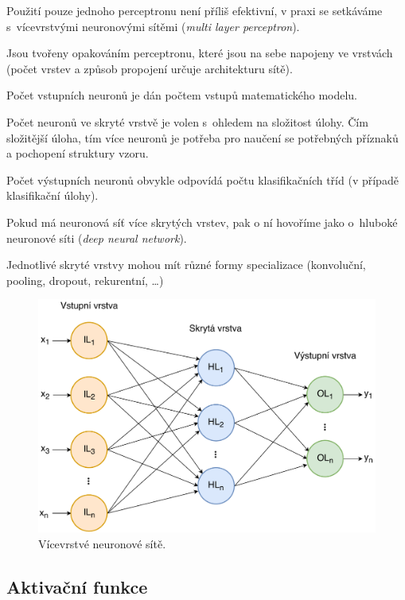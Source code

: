 \begin{compactitem}
    \item Použití pouze jednoho perceptronu není příliš efektivní, v praxi se setkáváme s~vícevrstvými neuronovými sítěmi (\textit{multi layer perceptron}).

    \item Jsou tvořeny opakováním perceptronu, které jsou na sebe napojeny ve vrstvách (počet vrstev a způsob propojení určuje architekturu sítě).

    \item Počet vstupních neuronů je dán počtem vstupů matematického modelu.

    \item Počet neuronů ve skryté vrstvě je volen s~ohledem na složitost úlohy. Čím složitější úloha, tím více neuronů je potřeba pro naučení se potřebných příznaků a pochopení struktury vzoru.

    \item Počet výstupních neuronů obvykle odpovídá počtu klasifikačních tříd (v případě klasifikační úlohy).

    \item Pokud má neuronová síť více skrytých vrstev, pak o ní hovoříme jako o~hluboké neuronové síti (\textit{deep neural network}).

    \item Jednotlivé skryté vrstvy mohou mít různé formy specializace (konvoluční, pooling, dropout, rekurentní, \dots)
\end{compactitem}

\begin{figure}[H]
    \centering
    \includegraphics[width=0.7\linewidth]{multi_layer.pdf}
    \caption{Vícevrstvé neuronové sítě.}
\end{figure}

\subsection{Aktivační funkce}

